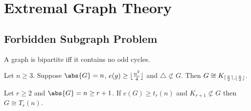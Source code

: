 \documentclass{article}
\DeclarePairedDelimiter\ceil{\lceil}{\rceil}
\DeclarePairedDelimiter\floor{\lfloor}{\rfloor}
\begin{document}
\section{Extremal Graph Theory}



























\subsection{Forbidden Subgraph Problem}

























\begin{nthm}\label{thm:7}
    A graph is bipartite iff it contains no odd cycles.
\end{nthm}












\begin{nthm}\label{thm:8}
    Let $n \geq 3$. Suppose $\abs{G} = n$, $e(g) \geq \floor{\frac{n^2}{4}}$ and $\triangle \not\subset G$.
    Then $G \cong K_{\ceil{\frac{n}{2}}, \floor{\frac{n}{2}}}$.
\end{nthm}











\begin{nthm}\label{thm:9}
    Let $r \geq 2$ and $\abs{G} = n \geq r+1$. If $e(G) \geq t_r(n)$ and $K_{r+1} \not\subset G$ then $G \cong T_r(n)$.
\end{nthm}
\end{document}
